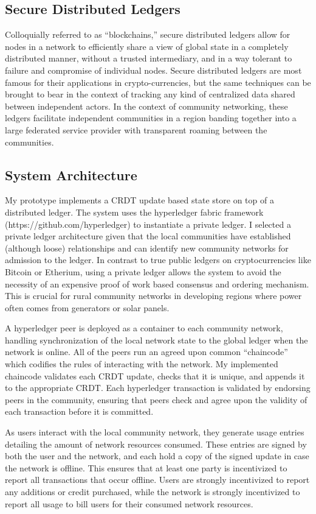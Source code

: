 \subsection{Secure Distributed Ledgers}
Colloquially referred to as ``blockchains,'' secure distributed
ledgers allow for nodes in a network to efficiently share a view of
global state in a completely distributed manner, without a trusted
intermediary, and in a way tolerant to failure and compromise of
individual nodes.\cite{BabuBlockchainTelco2016} Secure distributed
ledgers are most famous for their applications in crypto-currencies,
but the same techniques can be brought to bear in the context of
tracking any kind of centralized data shared between independent
actors. In the context of community networking, these ledgers
facilitate independent communities in a region banding together into a
large federated service provider with transparent roaming between the
communities.

\subsection{System Architecture}
My prototype implements a CRDT update based state store on top of a
distributed ledger. The system uses the hyperledger fabric framework
(https://github.com/hyperledger) to instantiate a private ledger. I
selected a private ledger architecture given that the local
communities have established (although loose) relationships and can
identify new community networks for admission to the ledger. In
contrast to true public ledgers on cryptocurrencies like Bitcoin or
Etherium, using a private ledger allows the system to avoid the
necessity of an expensive proof of work based consensus and ordering
mechanism. This is crucial for rural community networks in developing
regions where power often comes from generators or solar panels.

A hyperledger peer is deployed as a container to each community
network, handling synchronization of the local network state to the
global ledger when the network is online. All of the peers run an
agreed upon common ``chaincode'' which codifies the rules of
interacting with the network. My implemented chaincode validates each
CRDT update, checks that it is unique, and appends it to the
appropriate CRDT. Each hyperledger transaction is validated by
endorsing peers in the community, ensuring that peers check and agree
upon the validity of each transaction before it is committed.

As users interact with the local community network, they generate
usage entries detailing the amount of network resources
consumed. These entries are signed by both the user and the network,
and each hold a copy of the signed update in case the network is
offline. This ensures that at least one party is incentivized to
report all transactions that occur offline. Users are strongly
incentivized to report any additions or credit purchased, while the
network is strongly incentivized to report all usage to bill users for
their consumed network resources.

